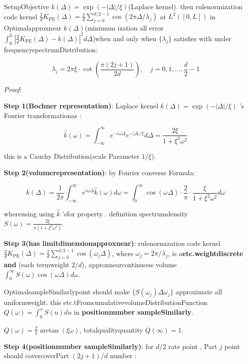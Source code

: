 \documentclass[
  12pt,
]{article}
\begin{document}
SetupObjective \(k(\Delta) = \exp(-|\Delta|/\xi)\)(Laplace
kernel). then rulenormization code kernel
\(\frac{2}{d}K_{\text{PE}}(\Delta) = \frac{2}{d}\sum_{j=0}^{d/2-1} \cos(2\pi\Delta/\lambda_j)\)
at  \(L^2([0, L])\) in Optimalapproxnear \(k(\Delta)\)(minimum ization all error 
\(\int_0^L |\frac{2}{d}K_{\text{PE}}(\Delta) - k(\Delta)|^2 d\Delta\))when and only when 
\(\{\lambda_j\}\) satisfies with under frequencyspectrumDistribution: 

\[\boxed{\lambda_j = 2\pi\xi \cdot \cot\left(\frac{\pi(2j+1)}{2d}\right), \quad j = 0, 1, \ldots, \frac{d}{2}-1}\]

\emph{Proof}: 

\textbf{Step 1(Bochner representation)}: Laplace kernel
\(k(\Delta) = \exp(-|\Delta|/\xi)\) 's Fourier transformationas : 

\[\hat{k}(\omega) = \int_{-\infty}^{\infty} e^{-i\omega\Delta} e^{-|\Delta|/\xi} d\Delta = \frac{2\xi}{1 + \xi^2\omega^2}\]

this is a Cauchy Distribution(scale Parameter \(1/\xi\)). 

\textbf{Step 2(volumerepresentation)}: by  Fourier converse Formula: 

\[k(\Delta) = \frac{1}{2\pi} \int_{-\infty}^{\infty} e^{i\omega\Delta} \hat{k}(\omega) d\omega = \int_{0}^{\infty} \cos(\omega\Delta) \cdot \frac{2}{\pi} \cdot \frac{\xi}{1 + \xi^2\omega^2} d\omega\]

whereusing using  \(\hat{k}\) 'sfor property . definition spectrumdensity
\(S(\omega) = \frac{2\xi}{\pi(1 + \xi^2\omega^2)}\). 

\textbf{Step 3(has limitdimensionapproxnear)}: rulenormization code kernel
\(\frac{2}{d}K_{\text{PE}}(\Delta) = \frac{2}{d}\sum_{j=0}^{d/2-1} \cos(\omega_j \Delta)\), where
\(\omega_j = 2\pi/\lambda_j\), is a\textbf{etc.weightdiscrete and }(each termweight
\(2/d\)), approxnearcontinuous volume
\(\int_0^{\infty} S(\omega)\cos(\omega\Delta)d\omega\). 

OptimalsampleSimilarlypoint should make  \(\{S(\omega_j)\Delta\omega_j\}\)
approximate all uniformweight. this etc.tFromcumulativevolumeDistributionFunction
\(Q(\omega) = \int_0^{\omega} S(u)du\) in \textbf{positionnumber sampleSimilarly}. 

\(Q(\omega) = \frac{2}{\pi} \arctan(\xi\omega)\), totalqualityquantity 
\(Q(\infty) = 1\). 

\textbf{Step 4(positionnumber sampleSimilarly)}: for  \(d/2\) rate point , Part \(j\)
point should covercoverPart \((2j+1)/d\) number : 
\end{document}
